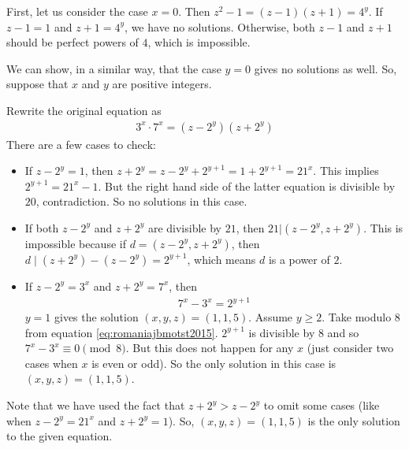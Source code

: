 		\begin{solution}
			First, let us consider the case $x=0$. Then $z^2-1 =(z-1)(z+1)=4^y$. If $z-1=1$ and $z+1=4^y$, we have no solutions. Otherwise, both $z-1$ and $z+1$ should be perfect powers of $4$, which is impossible.

			We can show, in a similar way, that the case $y=0$ gives no solutions as well. So, suppose that $x$ and $y$ are positive integers.

			Rewrite the original equation as
				\begin{align*}
					3^x \cdot 7^x = (z-2^y)(z+2^y)
				\end{align*}
			There are a few cases to check:
				\begin{itemize}
					\item If $z-2^y=1$, then $z+2^y = z-2^y+2^{y+1}=1+2^{y+1}=21^x$. This implies $2^{y+1}=21^x-1$. But the right hand side of the latter equation is divisible by $20$, contradiction. So no solutions in this case.

					\item If both $z-2^y$ and $z+2^y$ are divisible by $21$, then $21|(z-2^y, z+2^y)$. This is impossible because if $d=(z-2^y, z+2^y)$, then $d\mid (z+2^y) -(z-2^y)=2^{y+1}$, which means $d$ is a power of $2$.

					\item If $z-2^y=3^x$ and $z+2^y=7^x$, then
						\begin{align}\label{eq:romaniajbmotst2015}
							7^x-3^x=2^{y+1}
						\end{align}
			 $y=1$ gives the solution $(x,y,z)=(1,1,5)$. Assume $y \geq 2$. Take modulo $8$ from equation \eqref{eq:romaniajbmotst2015}. $2^{y+1}$ is divisible by $8$ and so $7^x-3^x \equiv 0 \pmod 8$. But this does not happen for any $x$ (just consider two cases when $x$ is even or odd). So the only solution in this case is $(x,y,z)=(1,1,5)$.
				\end{itemize}
			Note that we have used the fact that $z+2^y > z-2^y$ to omit some cases (like when $z-2^y=21^x$ and $z+2^y = 1$). So, $(x,y,z)=(1,1,5)$ is the only solution to the given equation.
		\end{solution}
